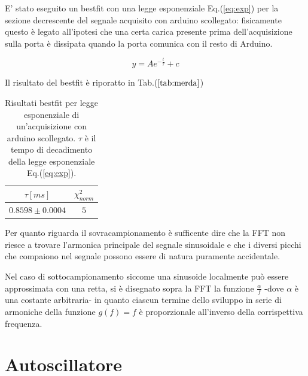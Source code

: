 \documentclass{article}
\begin{document}
    E' stato eseguito un bestfit con una legge esponenziale Eq.(\ref{eq:exp}) per la sezione decrescente
    del segnale acquisito con arduino scollegato: fisicamente questo è legato all'ipotesi 
    che una certa carica presente prima dell'acquisizione 
    sulla porta è dissipata quando la porta comunica con il resto di Arduino.
    
        \begin{equation}
            y=A e^{-\frac{t}{\tau}}+c
            \label{eq:exp}
        \end{equation}
    
    Il risultato del bestfit è riporatto in Tab.($\ref{tab:merda}$)
    

        \begin{table}[H]
            \centering
            \begin{tabular}{cc}
                $\tau[ms]$ & $\chi^2_{norm}$\\
                \hline
                $0.8598\pm0.0004$ &$5$\\
            \end{tabular}
        \caption{Risultati bestfit per legge esponenziale di un'acquisizione 
                con arduino scollegato. $\tau$ è il tempo di decadimento della legge 
                esponenziale Eq.(\ref{eq:exp}).}
        \label{tab:merda}
        \end{table}



    Per quanto riguarda il sovracampionamento è sufficente dire che la 
    FFT non riesce a trovare l'armonica principale del segnale sinusoidale e 
    che i diversi picchi che compaiono nel segnale possono essere di natura puramente
    accidentale.

    Nel caso di sottocampionamento siccome una sinusoide localmente può 
    essere approssimata con una retta, si è disegnato sopra la FFT la funzione
    $\frac{\alpha}{f}$ -dove $\alpha$ è una costante arbitraria-
    in quanto ciascun termine dello sviluppo in serie  di 
    armoniche della funzione $g(f)=f$ è proporzionale all'inverso della 
    corrispettiva frequenza.







\section{Autoscillatore}
\end{document}
